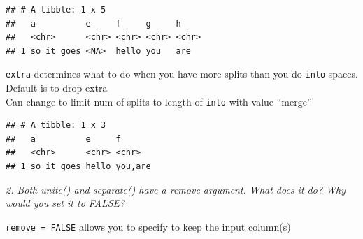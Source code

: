 \documentclass[]{book}
\newenvironment{Shaded}{\begin{snugshade}}{\end{snugshade}}
\newcommand{\DataTypeTok}[1]{\textcolor[rgb]{0.13,0.29,0.53}{#1}}
\newcommand{\KeywordTok}[1]{\textcolor[rgb]{0.13,0.29,0.53}{\textbf{#1}}}
\newcommand{\NormalTok}[1]{#1}
\newcommand{\OperatorTok}[1]{\textcolor[rgb]{0.81,0.36,0.00}{\textbf{#1}}}
\newcommand{\OtherTok}[1]{\textcolor[rgb]{0.56,0.35,0.01}{#1}}
\newcommand{\StringTok}[1]{\textcolor[rgb]{0.31,0.60,0.02}{#1}}
\theoremstyle{definition}
\theoremstyle{definition}
\theoremstyle{definition}
\theoremstyle{remark}
\begin{document}
\begin{verbatim}
## # A tibble: 1 x 5
##   a          e     f     g     h    
##   <chr>      <chr> <chr> <chr> <chr>
## 1 so it goes <NA>  hello you   are
\end{verbatim}

\texttt{extra} determines what to do when you have more splits than you
do \texttt{into} spaces. Default is to drop extra\\
Can change to limit num of splits to length of \texttt{into} with value
``merge''

\begin{Shaded}
\end{Shaded}

\begin{verbatim}
## # A tibble: 1 x 3
##   a          e     f      
##   <chr>      <chr> <chr>  
## 1 so it goes hello you,are
\end{verbatim}

\emph{2. Both unite() and separate() have a remove argument. What does
it do? Why would you set it to FALSE?}

\texttt{remove\ =\ FALSE} allows you to specify to keep the input
column(s)

\begin{Shaded}
\end{Shaded}
\end{document}
